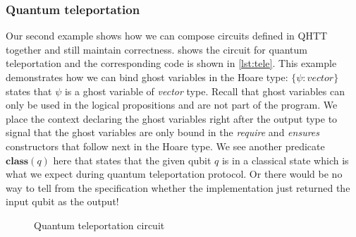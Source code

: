 \documentclass[adraft,creativecommons]{eptcs}
\theoremstyle{definition}
\theoremstyle{remark}
\begin{document}
\subsubsection{Quantum teleportation}
\label{sec:teleport}
Our second example shows how we can compose circuits defined in QHTT together and still maintain correctness.  shows the circuit for quantum teleportation and the corresponding code is shown in \cref{lst:tele}. This example demonstrates how we can bind ghost variables in the Hoare type: $\{\psi: \mathit{vector}\}$ states that $\psi$ is a ghost variable of \textit{vector} type. Recall that ghost variables can only be used in the logical propositions and are not part of the program. We place the context declaring the ghost variables right after the output type to signal that the ghost variables are only bound in the \textit{require} and \textit{ensures} constructors that follow next in the Hoare type. We see another predicate $\mathbf{class}(q)$ here that states that the given qubit $q$ is in a classical state which is what we expect during quantum teleportation protocol. Or there would be no way to tell from the specification whether the implementation just returned the input qubit as the output!

\begin{figure}
    \centering
    \caption{Quantum teleportation circuit}
    \label{fig:teleport}
\end{figure}




\end{document}
